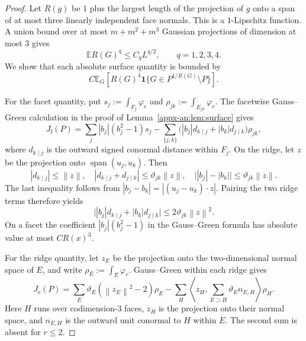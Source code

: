 \documentclass[11pt,letterpaper]{article}
\theoremstyle{remark}
\newcommand{\E}{\mathbb E}
\newcommand{\norm}[1]{\left\lVert#1\right\rVert}
\newcommand{\ind}{\mathbf 1}
\begin{document}
\begin{proof}
Let $R(g)$ be $1$ plus the largest length of the projection of $g$
onto a span of at most three linearly independent face normals.
This is a $1$-Lipschitz function. A union bound over at most
$m+m^2+m^3$ Gaussian projections of dimension at most $3$ gives
\begin{equation}
 \E R(G)^q\le C_qL^{q/2},\qquad q=1,2,3,4.
 \label{h3:eq:R-moments}
\end{equation}
We show that each absolute surface quantity is bounded by
\begin{equation}
 C\E_G\left[R(G)^4
       \ind\{G\in P^{1/R(G)}\setminus P\}\right].
 \label{h3:eq:localized}
\end{equation}

For the facet quantity, put $s_j:=\int_{F_j}\varphi_r$ and
$\rho_{jk}:=\int_{E_{jk}}\varphi_r$.
The facetwise Gauss--Green calculation in the proof of Lemma~\ref{appx-an:lem:surface} gives
\[
 J_{\mathrm f}(P)
 =\sum_j |b_j|(b_j^2-1)s_j
 -\sum_{\{j,k\}}
   \bigl(|b_j|d_{k\mid j}+|b_k|d_{j\mid k}\bigr)\rho_{jk},
\]
where $d_{k\mid j}$ is the outward signed conormal distance within
$F_j$. On the ridge, let $z$ be the projection onto
$\operatorname{span}(u_j,u_k)$. Then
\[
 |d_{k\mid j}|\le\norm z,\quad
 |d_{k\mid j}+d_{j\mid k}|\le\vartheta_{jk}\norm z,\quad
 \bigl||b_j|-|b_k|\bigr|\le\vartheta_{jk}\norm z.
\]
The last inequality follows from
$|b_j-b_k|=|(u_j-u_k)\cdot z|$.
Pairing the two ridge terms therefore yields
\begin{equation}
 \bigl||b_j|d_{k\mid j}+|b_k|d_{j\mid k}\bigr|
 \le 2\vartheta_{jk}\norm z^2.
 \label{h3:eq:weighted-pair}
\end{equation}
On a facet the coefficient $|b_j|(b_j^2-1)$ in the
Gauss--Green formula has absolute value at most $CR(x)^3$.

For the ridge quantity, let $z_E$ be the projection onto the
two-dimensional normal space of $E$, and write $\rho_E:=\int_E\varphi_r$.
Gauss--Green within each ridge gives
\begin{equation}
 J_{\mathrm e}(P)
 =\sum_E\vartheta_E(\norm{z_E}^2-2)\rho_E
 -\sum_H\left\langle z_H,
        \sum_{E\supset H}\vartheta_E n_{E,H}\right\rangle\rho_H.
 \label{h3:eq:edge-identity}
\end{equation}
Here $H$ runs over codimension-$3$ faces, $z_H$ is the projection onto
their normal space, and $n_{E,H}$ is the outward unit conormal to $H$
within $E$. The second sum is absent for $r\le2$.


\end{proof}
\end{document}
